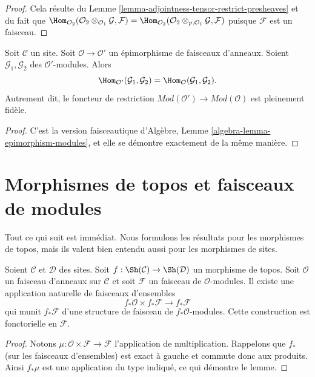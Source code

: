 \begin{proof}
Cela résulte du Lemme \ref{lemma-adjointness-tensor-restrict-presheaves} et du
fait que
$\Hom_{\mathcal{O}_2}(
\mathcal{O}_2 \otimes_{\mathcal{O}_1} \mathcal{G},
\mathcal{F}
)
=
\Hom_{\mathcal{O}_2}(
\mathcal{O}_2 \otimes_{p, \mathcal{O}_1} \mathcal{G},
\mathcal{F}
)$
puisque $\mathcal{F}$ est un faisceau.
\end{proof}

\begin{lemma}
\label{lemma-epimorphism-modules}
Soit $\mathcal{C}$ un site. Soit $\mathcal{O} \to \mathcal{O}'$ un
épimorphisme de faisceaux d'anneaux. Soient
$\mathcal{G}_1, \mathcal{G}_2$ des $\mathcal{O}'$-modules. Alors
$$
\Hom_{\mathcal{O}'}(\mathcal{G}_1, \mathcal{G}_2) =
\Hom_\mathcal{O}(\mathcal{G}_1, \mathcal{G}_2).
$$
Autrement dit, le foncteur de restriction
$\textit{Mod}(\mathcal{O}') \to \textit{Mod}(\mathcal{O})$ est pleinement
fidèle.
\end{lemma}

\begin{proof}
C'est la version faisceautique d'Algèbre, Lemme
\ref{algebra-lemma-epimorphism-modules}, et elle se démontre exactement de la
même manière.
\end{proof}




\section{Morphismes de topos et faisceaux de modules}
\label{section-sheaves-modules-functorial}

\noindent
Tout ce qui suit est immédiat. Nous formulons les résultats pour les morphismes
de topos, mais ils valent bien entendu aussi pour les morphismes de sites.

\begin{lemma}
\label{lemma-pushforward-module}
Soient $\mathcal{C}$ et $\mathcal{D}$ des sites. Soit
$f : \Sh(\mathcal{C}) \to \Sh(\mathcal{D})$ un morphisme de topos. Soit
$\mathcal{O}$ un faisceau d'anneaux sur $\mathcal{C}$ et soit $\mathcal{F}$ un
faisceau de $\mathcal{O}$-modules. Il existe une application naturelle de
faisceaux d'ensembles
$$
f_*\mathcal{O} \times f_*\mathcal{F}
\longrightarrow
f_*\mathcal{F}
$$
qui munit $f_*\mathcal{F}$ d'une structure de faisceau de
$f_*\mathcal{O}$-modules. Cette construction est fonctorielle en $\mathcal{F}$.
\end{lemma}

\begin{proof}
Notons $\mu : \mathcal{O} \times \mathcal{F} \to \mathcal{F}$ l'application
de multiplication. Rappelons que $f_*$ (sur les faisceaux d'ensembles) est
exact à gauche et commute donc aux produits. Ainsi $f_*\mu$ est une application
du type indiqué, ce qui démontre le lemme.
\end{proof}

